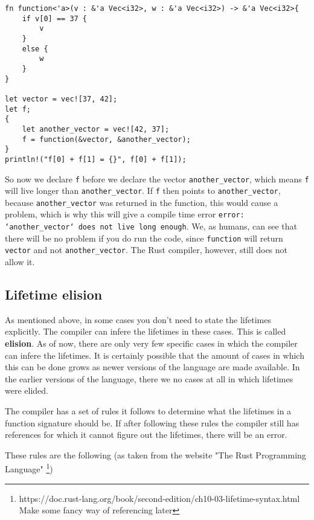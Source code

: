 \begin{verbatim}
fn function<'a>(v : &'a Vec<i32>, w : &'a Vec<i32>) -> &'a Vec<i32>{
    if v[0] == 37 {
        v
    }
    else {
        w
    }
}

let vector = vec![37, 42];
let f;
{
    let another_vector = vec![42, 37];
    f = function(&vector, &another_vector);
}
println!("f[0] + f[1] = {}", f[0] + f[1]);
\end{verbatim}

So now we declare \verb|f| before we declare the vector \verb|another_vector|, which means \verb|f| will live longer than \verb|another_vector|. If \verb|f| then points to \verb|another_vector|, because \verb|another_vector| was returned in the function, this would cause a problem, which is why this will give a compile time error \texttt{error: `another_vector` does not live long enough}. We, as humans, can see that there will be no problem if you do run the code, since \verb|function| will return \verb|vector| and not \verb|another_vector|. The Rust compiler, however, still does not allow it. 

\subsection{Lifetime elision}
As mentioned above, in some cases you don't need to state the lifetimes explicitly. The compiler can infere the lifetimes in these cases. This is called \textbf{elision}. As of now, there are only very few specific cases in which the compiler can infere the lifetimes. It is certainly possible that the amount of cases in which this can be done grows as newer versions of the language are made available. In the earlier versions of the language, there we no cases at all in which lifetimes were elided. 

The compiler has a set of rules it follows to determine what the lifetimes in a function signature should be. If after following these rules the compiler still has references for which it cannot figure out the lifetimes, there will be an error. 

These rules are the following (as taken from the website "The Rust Programming Language" \footnote{https://doc.rust-lang.org/book/second-edition/ch10-03-lifetime-syntax.html Make some fancy way of referencing later})

